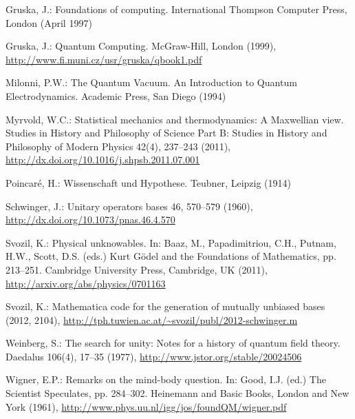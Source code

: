 \documentclass{llncs}
\begin{document}
\begin{thebibliography}{10}
Gruska, J.: Foundations of computing. International Thompson Computer Press,
  London (April 1997)

Gruska, J.: Quantum Computing. McGraw-Hill, London (1999),
  \url{http://www.fi.muni.cz/usr/gruska/qbook1.pdf}

Milonni, P.W.: The Quantum Vacuum. {A}n Introduction to Quantum
  Electrodynamics. Academic Press, San Diego (1994)

Myrvold, W.C.: Statistical mechanics and thermodynamics: A {M}axwellian view.
  Studies in History and Philosophy of Science Part B: Studies in History and
  Philosophy of Modern Physics  42(4),  237--243 (2011),
  \url{http://dx.doi.org/10.1016/j.shpsb.2011.07.001}

Poincar{\'{e}}, H.: Wissenschaft und Hypothese. Teubner, Leipzig (1914)

Schwinger, J.: Unitary operators bases  46,  570--579 (1960),
  \url{http://dx.doi.org/10.1073/pnas.46.4.570}

Svozil, K.: Physical unknowables. In: Baaz, M., Papadimitriou, C.H., Putnam,
  H.W., Scott, D.S. (eds.) {K}urt {G}{\"o}del and the Foundations of
  Mathematics, pp. 213--251. Cambridge University Press, Cambridge, UK (2011),
  \url{http://arxiv.org/abs/physics/0701163}

Svozil, K.: Mathematica code for the generation of mutually unbiased bases
  (2012, 2104), \url{http://tph.tuwien.ac.at/~svozil/publ/2012-schwinger.m}

Weinberg, S.: The search for unity: Notes for a history of quantum field
  theory. Daedalus  106(4),  17--35 (1977),
  \url{http://www.jstor.org/stable/20024506}

Wigner, E.P.: Remarks on the mind-body question. In: Good, I.J. (ed.) The
  Scientist Speculates, pp. 284--302. Heinemann and Basic Books, London and New
  York (1961), \url{http://www.phys.uu.nl/igg/jos/foundQM/wigner.pdf}

\end{thebibliography}
\end{document}
